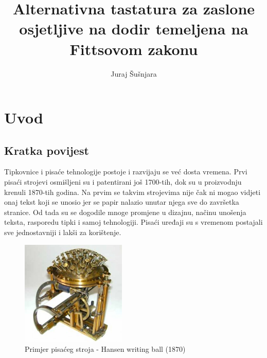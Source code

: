 \documentclass[times, utf8, zavrsni]{fer}
\begin{document}

\title{Alternativna tastatura za zaslone osjetljive na dodir temeljena na Fittsovom zakonu}

\author{Juraj Šušnjara}

\maketitle

\izvornik

\zahvala{}

\tableofcontents

\chapter{Uvod}
\section{Kratka povijest}
Tipkovnice i pisaće tehnologije postoje i razvijaju se već dosta vremena. Prvi pisaći strojevi osmišljeni su i patentirani još 1700-tih, dok su u proizvodnju krenuli 1870-tih godina. Na prvim se takvim strojevima nije čak ni mogao vidjeti onaj tekst koji se unosio jer se papir nalazio unutar njega sve do završetka stranice. Od tada su se dogodile mnoge promjene u dizajnu, načinu unošenja teksta, rasporedu tipki i samoj tehnologiji. Pisaći uređaji su s vremenom postajali sve jednostavniji i lakši za korištenje.

\begin{figure}[htb]
\centering
\includegraphics[width=5cm]{img/hansen.jpg}
\caption{Primjer pisaćeg stroja - Hansen writing ball (1870)}
\label{fig:hansen}
\end{figure}
\end{document}
